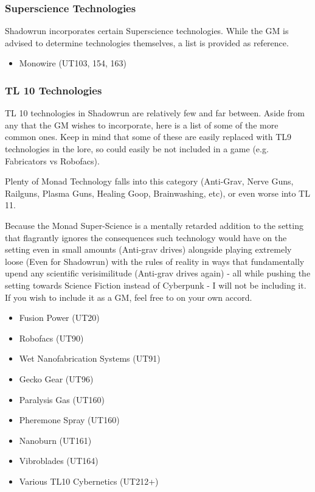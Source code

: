 \begin{multicols}{3}
	\subsubsection{Superscience Technologies}
	
	Shadowrun incorporates certain Superscience technologies. While the GM is advised to determine technologies themselves, a list is provided as reference.
	
	\begin{itemize}
		\item Monowire (UT103, 154, 163)
	\end{itemize}
	
	\subsubsection{TL 10 Technologies}
	
	TL 10 technologies in Shadowrun are relatively few and far between. Aside from any that the GM wishes to incorporate, here is a list of some of the more common ones. Keep in mind that some of these are easily replaced with TL9 technologies in the lore, so could easily be not included in a game (e.g. Fabricators vs Robofacs).
	
	Plenty of Monad Technology falls into this category (Anti-Grav, Nerve Guns, Railguns, Plasma Guns, Healing Goop, Brainwashing, etc), or even worse into TL 11.
	
	Because the Monad Super-Science is a mentally retarded addition to the setting that flagrantly ignores the consequences such technology would have on the setting even in small amounts (Anti-grav drives) alongside playing extremely loose (Even for Shadowrun) with the rules of reality in ways that fundamentally upend any scientific verisimilitude (Anti-grav drives again) - all while pushing the setting towards Science Fiction instead of Cyberpunk - I will not be including it. If you wish to include it as a GM, feel free to on your own accord.
	
	\begin{itemize}
		\itemsep 0pt
		\item Fusion Power (UT20)
		\item Robofacs (UT90)
		\item Wet Nanofabrication Systems (UT91)
		\item Gecko Gear (UT96)
		\item Paralysis Gas (UT160)
		\item Pheremone Spray (UT160)
		\item Nanoburn (UT161)
		\item Vibroblades (UT164)
		\item Various TL10 Cybernetics (UT212+)
	\end{itemize}
	

\end{multicols}
